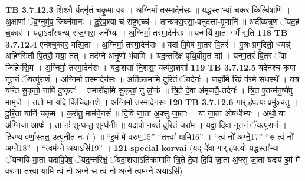 \documentclass[17pt]{extarticle}
\begin{document}
{{{{{{{{{{{{{{{{{{{                  \newline
                                \textbf{ TB 3.7.12.3} \newline
                  शि॒श्ञै र्यदनृ॑तं चकृ॒मा व॒यं । अ॒ग्निर्मा॒ तस्मा॒देन॑सः ॥ यद्धस्ता᳚भ्यां च॒कर॒ किल्बि॑षाणि । अ॒क्षाणां᳚ ॅव॒ग्नुमु॑प॒ जिघ्न॑मानः । दू॒रे॒प॒श्या च॑ राष्ट्र॒भृच्च॑ । तान्य॑फ्स॒रसा॒-वनु॑दत्ता-मृ॒णानि॑ ॥ अदी᳚व्यन्नृ॒णं ॅयद॒हं च॒कार॑ । यद्वाऽदा᳚स्यन्थ् संज॒गारा॒ जने᳚भ्यः । अ॒ग्निर्मा॒ तस्मा॒देन॑सः ॥ यन्मयि॑ मा॒ता गर्भे॑ स॒ति \textbf{ 118} \newline
                  \newline
                                \textbf{ TB 3.7.12.4} \newline
                  एन॑श्च॒कार॒ यत्पि॒ता । अ॒ग्निर्मा॒ तस्मा॒देन॑सः ॥ यदा॑ पि॒पेष॑ मा॒तरं॑ पि॒तरं᳚ । पु॒त्रः प्रमु॑दितो॒ धयन्न्॑ । अहिꣳ॑सितौ पि॒तरौ॒ मया॒ तत् । तद॑ग्ने अनृ॒णो भ॑वामि ॥ यद॒न्तरि॑क्षं पृथि॒वीमु॒त द्यां । यन्मा॒तरं॑ पि॒तरं॑ ॅवा जिहिꣳसि॒म । अ॒ग्निर्मा॒ तस्मा॒देन॑सः ॥ यदा॒शसा॑ नि॒शसा॒ यत्प॑रा॒शसा᳚ \textbf{ 119} \newline
                  \newline
                                \textbf{ TB 3.7.12.5} \newline
                  यदेन॑श्च कृ॒मा नूत॑नं॒ ॅयत्पु॑रा॒णं । अ॒ग्निर्मा॒ तस्मा॒देन॑सः ॥ अति॑क्रामामि दुरि॒तं ॅयदेनः॑ । जहा॑मि रि॒प्रं प॑र॒मे स॒धस्थे᳚ । यत्र॒ यन्ति॑ सु॒कृतो॒ नापि॑ दु॒ष्कृतः॑ । तमारो॑हामि सु॒कृतां॒ नु लो॒कं ॥ त्रि॒ते दे॒वा अ॑मृजतै॒-तदेनः॑ । त्रि॒त ए॒तन्म॑नु॒ष्ये॑षु मामृजे । ततो॑ मा॒ यदि॒ किंचि॑दान॒शे । अ॒ग्निर्मा॒ तस्मा॒देन॑सः \textbf{ 120} \newline
                  \newline
                                \textbf{ TB 3.7.12.6} \newline
                  गार्.ह॑पत्यः॒ प्रमु॑ञ्चतु । दु॒रि॒ता यानि॑ चकृ॒म । क॒रोतु॒ माम॑ने॒नसं᳚ ॥ दि॒वि जा॒ता अ॒फ्सु जा॒ताः । या जा॒ता ओष॑धीभ्यः । अथो॒ या अ॑ग्नि॒जा आपः॑ । ता नः॑ शुन्धन्तु॒ शुन्ध॑नीः ॥ यदापो॒ नक्तं॑ दुरि॒तं चरा॑म । यद्वा॒ दिवा॒ नूत॑नं॒ ॅयत्पु॑रा॒णं । हिर॑ण्य-वर्णा॒स्तत॒ उत्पु॑नीत नः ( ) ॥ “इ॒मं मे॑ वरुण॒{15}” “तत्त्वा॑ यामि{16}” । “त्वं नो॑ अग्ने॒{17}” “स त्वं नो॑ अग्ने{18}” । “त्वम॑ग्ने अ॒याऽसि॑{19}” । \textbf{ 121} \newline
                  \newline
                                                        \textbf{special korvai} \newline
              (यद् दे॑वा॒ गार्.ह॑पत्यो॒ यद्धस्ता᳚भ्यां॒ ॅयन्मयि॑ मा॒ता यदा॑पि॒पेष॒ ॅयद॒न्तरि॑क्षं॒ ॅयदा॒शसाऽति॑क्रामामि त्रि॒ते दे॒वा दि॒वि जा॒ता अ॒फ्सु जा॒ता यदाप॑ इ॒मं मे॑ वरुणा॒ तत्त्वा॑ यामि॒ त्वं नो॑ अग्ने॒ स त्वं नो॑ अग्ने॒ त्वम॑ग्ने अ॒याऽसि॑) \newline
}}}}}}}}}}}}}}}}}}}
\end{document}
